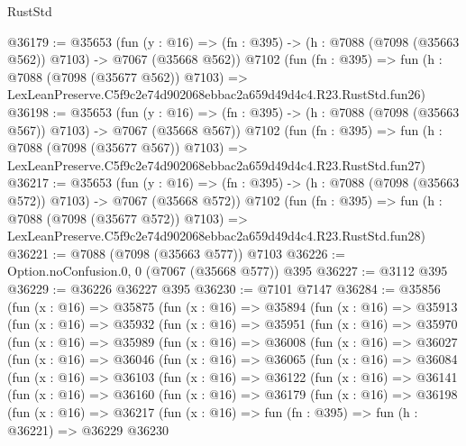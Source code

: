 \begin{lexlean}{RustStd}
\begin{coremodule}
@36179 := @35653
    (fun (y : @16) => (fn : @395) -> (h : @7088 (@7098 (@35663 @562)) @7103) -> @7067 (@35668 @562))
    @7102
    (fun (fn : @395) =>
    fun (h : @7088 (@7098 (@35677 @562)) @7103) =>
    LexLeanPreserve.C5f9c2e74d902068ebbac2a659d49d4c4.R23.RustStd.fun26)
@36198 := @35653
    (fun (y : @16) => (fn : @395) -> (h : @7088 (@7098 (@35663 @567)) @7103) -> @7067 (@35668 @567))
    @7102
    (fun (fn : @395) =>
    fun (h : @7088 (@7098 (@35677 @567)) @7103) =>
    LexLeanPreserve.C5f9c2e74d902068ebbac2a659d49d4c4.R23.RustStd.fun27)
@36217 := @35653
    (fun (y : @16) => (fn : @395) -> (h : @7088 (@7098 (@35663 @572)) @7103) -> @7067 (@35668 @572))
    @7102
    (fun (fn : @395) =>
    fun (h : @7088 (@7098 (@35677 @572)) @7103) =>
    LexLeanPreserve.C5f9c2e74d902068ebbac2a659d49d4c4.R23.RustStd.fun28)
@36221 := @7088 (@7098 (@35663 @577)) @7103
@36226 := Option.noConfusion.{0, 0} (@7067 (@35668 @577)) @395
@36227 := @3112 @395
@36229 := @36226 @36227 @395
@36230 := @7101 @7147
@36284 := @35856
    (fun (x : @16) =>
    @35875
      (fun (x : @16) =>
      @35894
        (fun (x : @16) =>
        @35913
          (fun (x : @16) =>
          @35932
            (fun (x : @16) =>
            @35951
              (fun (x : @16) =>
              @35970
                (fun (x : @16) =>
                @35989
                  (fun (x : @16) =>
                  @36008
                    (fun (x : @16) =>
                    @36027
                      (fun (x : @16) =>
                      @36046
                        (fun (x : @16) =>
                        @36065
                          (fun (x : @16) =>
                          @36084
                            (fun (x : @16) =>
                            @36103
                              (fun (x : @16) =>
                              @36122
                                (fun (x : @16) =>
                                @36141
                                  (fun (x : @16) =>
                                  @36160
                                    (fun (x : @16) =>
                                    @36179
                                      (fun (x : @16) =>
                                      @36198
                                        (fun (x : @16) =>
                                        @36217
                                          (fun (x : @16) =>
                                          fun (fn : @395) =>
                                          fun (h : @36221) =>
                                          @36229
                                            @36230

\end{coremodule}
\end{lexlean}
